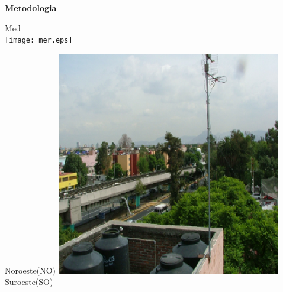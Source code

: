 \documentclass{article}
\begin{document}
\begin{minipage}{0.53\linewidth}
\vspace{-0.16cm}
\begin{center}
\begin{shaded}
\textbf{\textcolor{ver}{Metodologia}}
\end{shaded}
\vspace{-0.7cm}
\end{center}
\begin{minipage}{0.5\linewidth}
\begin{center}
\colorbox{ner}{\changefontsizes{9pt} \hspace{3.07cm}Med\hspace{3.07cm}\vspace{0.3cm}}\vspace{0.2cm}\\
\texttt{[image: mer.eps]}
\end{center}
\end{minipage}
\hspace{0.1cm}
\begin{minipage}{0.23\linewidth}
\colorbox{ner}{\changefontsizes{9pt} \hspace{0.3cm} Noroeste(NO) \hspace{0.3cm}}
\includegraphics[scale=0.68]{images/noroeste.eps}\\
\colorbox{ner}{\changefontsizes{9pt} \hspace{0.4cm} Suroeste(SO) \hspace{0.4cm}}

\end{minipage}
\end{minipage}
\end{document}

